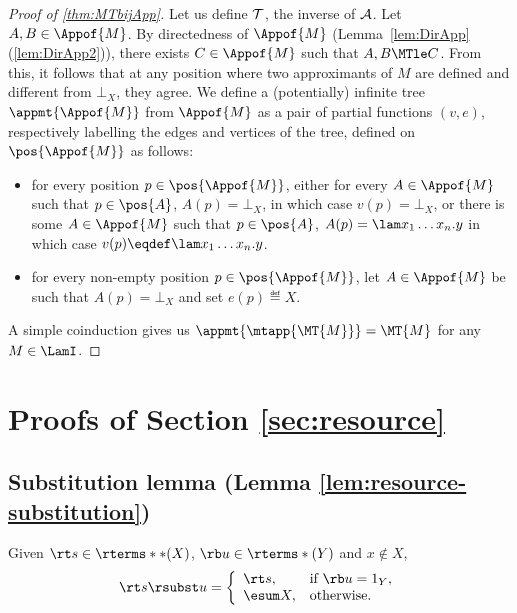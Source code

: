 \begin{proof}[Proof of \cref{thm:MTbijApp}]
	Let us define ${\cal T}$, the inverse of ${\cal A}$.
	Let $A, B\in \Appof{M}$. 
	By directedness of $\Appof{M}$ 
	(Lemma~\ref{lem:DirApp}(\ref{lem:DirApp2})), 
	there exists $C\in\Appof{M}$ such  that $A,B\MTle C$.
	From this, it follows that at any position where 
	two approximants of $M$ are defined and different from $\bot_X$, 
	they agree. 
	We  define a (potentially) infinite tree $\appmt{\Appof{M}}$ 
	from $\Appof{M}$ as a pair of partial functions $(v,e)$, 
	respectively labelling the edges and vertices of the tree, 
	defined on $\pos{\Appof{M}}$ as follows: 
	\begin{itemize}
		\item for every position $p \in \pos{\Appof{M}}$, 
		either for every $A\in \Appof{M}$ such that $p\in\pos{A}$, 
		$A(p)=\bot_X$, in which case $v(p) = \bot_X$, 
		or there is some $A\in \Appof{M}$ such that $p\in\pos{A}$, 
		$A(p)=\lam x_1\ldots x_n.y$ in which case 
		$v(p)\eqdef\lam x_1\ldots x_n.y$.
		\item for every non-empty position $p \in \pos{\Appof{M}}$,
		let $A\in \Appof{M}$ be such that $A(p)=\bot_X$ and 
		set $e(p)\eqdef X$.
	\end{itemize}
	A simple coinduction gives us 
	$\appmt{\mtapp{\MT{M}}}=\MT{M}$ for any $M\in\LamI$.
\end{proof}

\section{Proofs of Section \ref{sec:resource}}


\subsection{Substitution lemma (Lemma \ref{lem:resource-substitution})}


\begin{lemma} \label{lem:rsubst-x-notin-fv}
	Given $\rt s \in \rterms**(X)$, $\rb u \in \rterms*(Y)$
	and $x \notin X$,
	\[	\rt s \rsubst u = \left\{ \begin{array}{ll}
		\rt s, & \text{if $\rb u = 1_Y$,} \\
		\esum X, & \text{otherwise.}
		\end{array} \right. \]
\end{lemma}

